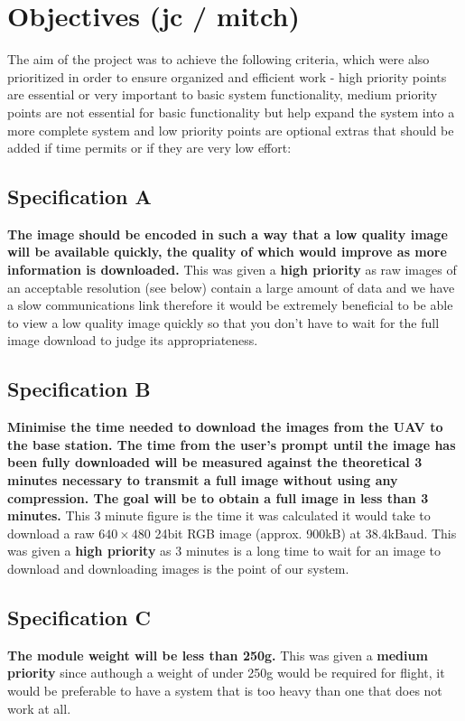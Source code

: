\section{Objectives (jc / mitch)} 

The aim of the project was to achieve the following criteria, which were also prioritized in order to ensure organized and efficient work - high priority points are essential or very important to basic system functionality, medium priority points are not essential for basic functionality but help expand the system into a more complete system and low priority points are optional extras that should be added if time permits or if they are very low effort:

	\subsection{Specification A}\label{sec:spec_a} \textbf{The image should be encoded in such a way that a low quality image will be available quickly, the quality of which would improve as more information is downloaded.} This was given a \textbf{high priority} as raw images of an acceptable resolution (see below) contain a large amount of data and we have a slow communications link therefore it would be extremely beneficial to be able to view a low quality image quickly so that you don't have to wait for the full image download to judge its appropriateness.
	\subsection{Specification B}\label{sec:spec_b} \textbf{Minimise the time needed to download the images from the UAV to the base station. The time from the user’s prompt until the image has been fully downloaded will be measured against the theoretical 3 minutes necessary to transmit a full image without using any compression. The goal will be to obtain a full image in \textbf{less than 3 minutes.}} 
This 3 minute figure is the time it was calculated it would take to download a raw $640\times480$ 24bit RGB image (approx. 900kB) at 38.4kBaud. This was given a \textbf{high priority} as 3 minutes is a long time to wait for an image to download and downloading images is the point of our system.
	\subsection{Specification C}\label{sec:spec_c} \textbf{The module weight will be \textbf{less than 250g}.} 
This was given a \textbf{medium priority} since authough a weight of under 250g would be required for flight, it would be preferable to have a system that is too heavy than one that does not work at all.%

